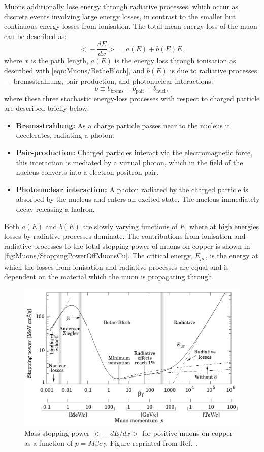 Muons additionally lose energy through radiative processes, which occur as discrete events involving large energy losses, in contrast to the smaller but continuous energy losses from ionisation. The total mean energy loss of the muon can be described as:
\begin{equation}\label{eqn:Muons/totMeanEnergyLossMu}
    \Biggl<-\frac{dE}{dx}\Biggl>=a(E)+b(E)E,
\end{equation}
where $x$ is the path length, $a(E)$ is the energy loss through ionisation as described with \autoref{eqn:Muons/BetheBloch}, and $b(E)$ is due to radiative
processes — bremsstrahlung, pair production, and photonuclear interactions:
\begin{equation}\label{eqn:Muons/radproc}
    b\equiv b_{\text{brems}}+b_{\text{pair}}+b_{\text{nucl}},
\end{equation}
where these three stochastic energy-loss processes with respect to charged particle are described briefly below:
\begin{itemize}
    \item \textbf{Bremsstrahlung:} As a charge particle passes near to the nucleus it decelerates, radiating a photon.
    \item \textbf{Pair-production:} Charged particles interact via the electromagnetic force, this interaction is mediated by a virtual photon, which in the field of the nucleus converts into a electron-positron pair.
    \item \textbf{Photonuclear interaction:} A photon radiated by the charged particle is absorbed by the nucleus and enters an excited state. The nucleus immediately decay releasing a hadron.
\end{itemize}
Both $a(E)$ and $b(E)$ are slowly varying functions of $E$, where at high energies losses by radiative processes dominate. The contributions from ionisation and radiative processes to the total stopping power of muons on copper is shown in \autoref{fig:Muons/StoppingPowerOffMuonsCu}. The critical energy, $E_{\mu c}$, is the energy at which the losses from ionisation and radiative processes are equal and is dependent on the material which the muon is propagating through.
\begin{figure}
    \centering
    \includegraphics[width=0.8\linewidth]{figures/Muons/MassMuonStoppingPowerOfMuonsOnCu.png}
    \caption{Mass stopping power $\big<-dE/dx\big>$ for positive muons on copper as a function of $p=M\beta c\gamma$. Figure reprinted from Ref.~\cite{GROOM2001183}.}
    \label{fig:Muons/StoppingPowerOffMuonsCu}
\end{figure}
